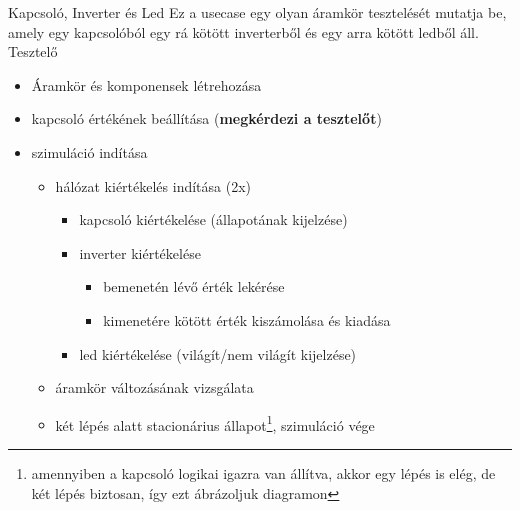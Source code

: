 \usecase
{Kapcsoló, Inverter és Led}
{Ez a usecase egy olyan áramkör tesztelését mutatja be, amely egy kapcsolóból egy rá kötött inverterből és egy arra kötött ledből áll.}
{Tesztelő}
{\vspace{-15pt}
\begin{itemize}
\setlength{\itemsep}{0cm}%
\setlength{\parskip}{0cm}%
\item Áramkör és komponensek létrehozása
\item kapcsoló értékének beállítása (\textbf{megkérdezi a tesztelőt})
\item szimuláció indítása
\begin{itemize}
\setlength{\itemsep}{0cm}%
\setlength{\parskip}{0cm}%
\item hálózat kiértékelés indítása (2x)
\begin{itemize}
\setlength{\itemsep}{0cm}%
\setlength{\parskip}{0cm}%
\item kapcsoló kiértékelése (állapotának kijelzése)
\item inverter kiértékelése
\begin{itemize}
\setlength{\itemsep}{0cm}%
\setlength{\parskip}{0cm}%
\item bemenetén lévő érték lekérése
\item kimenetére kötött érték kiszámolása és kiadása
\end{itemize}
\item led kiértékelése (világít/nem világít kijelzése)
\end{itemize}
\item áramkör változásának vizsgálata
\item két lépés alatt stacionárius állapot\footnote{amennyiben a kapcsoló logikai igazra van állítva, akkor egy lépés is elég, de két lépés biztosan, így ezt ábrázoljuk diagramon}, szimuláció vége
\end{itemize}
\end{itemize}
\vspace{-15pt}}

